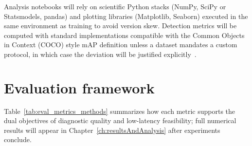 \documentclass[
english,                 %
bibtex,                  %
]{kththesis}
\numberwithin{listing}{chapter}
\begin{document}
Analysis notebooks will rely on scientific Python stacks (NumPy, SciPy or Statsmodels, pandas) and plotting libraries (Matplotlib, Seaborn) executed in the same environment as training to avoid version skew.
Detection metrics will be computed with standard implementations compatible with the Common Objects in Context (COCO) style mAP definition unless a dataset mandates a custom protocol, in which case the deviation will be justified explicitly~\cite{lin2017_focal_loss_retinanet}.


\section{Evaluation framework}
\label{sec:evaluationFramework}

Table~\ref{tab:eval_metrics_methods} summarizes how each metric supports the dual objectives of diagnostic quality and low-latency feasibility; full numerical results will appear in Chapter~\ref{ch:resultsAndAnalysis} after experiments conclude.
\end{document}
